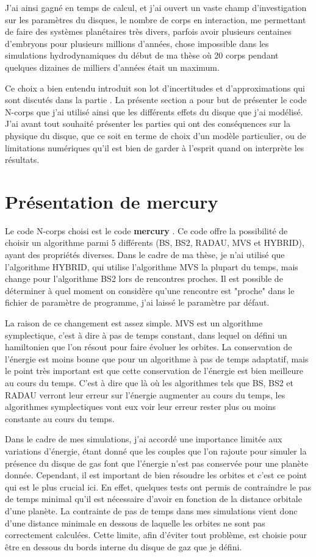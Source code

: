 \documentclass[logos,parttoc]{bordeaux-thesis}
\begin{document}
J'ai ainsi gagné en temps de calcul, et j'ai ouvert un vaste champ d'investigation sur les paramètres du disques, le nombre de corps en interaction, me permettant de faire des systèmes planétaires très divers, parfois avoir plusieurs centaines d'embryons pour plusieurs millions d'années, chose impossible dans les simulations hydrodynamiques du début de ma thèse où 20 corps pendant quelques dizaines de milliers d'années était un maximum. 

Ce choix a bien entendu introduit son lot d'incertitudes et d'approximations qui sont discutés dans la partie . La présente section a pour but de présenter le code N-corps que j'ai utilisé ainsi que les différents effets du disque que j'ai modélisé. J'ai avant tout souhaité présenter les parties qui ont des conséquences sur la physique du disque, que ce soit en terme de choix d'un modèle particulier, ou de limitations numériques qu'il est bien de garder à l'esprit quand on interprète les résultats.

\section{Présentation de mercury}
Le code N-corps choisi est le code \textbf{mercury} \citep{chambers1999hybrid}. Ce code offre la possibilité de choisir un algorithme parmi 5 différents (BS, BS2, RADAU, MVS et HYBRID), ayant des propriétés diverses. Dans le cadre de ma thèse, je n'ai utilisé que l'algorithme HYBRID, qui utilise l'algorithme MVS la plupart du temps, mais change pour l'algorithme BS2 lors de rencontres proches. Il est possible de déterminer à quel moment on considère qu'une rencontre est "proche" dans le fichier de paramètre de programme, j'ai laissé le paramètre par défaut. 

La raison de ce changement est assez simple. MVS est un algorithme symplectique, c'est à dire à pas de temps constant, dans lequel on défini un hamiltonien que l'on résout pour faire évoluer les orbites. La conservation de l'énergie est moins bonne que pour un algorithme à pas de temps adaptatif, mais le point très important est que cette conservation de l'énergie est bien meilleure au cours du temps. C'est à dire que là où les algorithmes tels que BS, BS2 et RADAU verront leur erreur sur l'énergie augmenter au cours du temps, les algorithmes symplectiques vont eux voir leur erreur rester plus ou moins constante au cours du temps. 

Dans le cadre de mes simulations, j'ai accordé une importance limitée aux variations d'énergie, étant donné que les couples que l'on rajoute pour simuler la présence du disque de gas font que l'énergie n'est pas conservée pour une planète donnée. Cependant, il est important de bien résoudre les orbites et c'est ce point qui est le plus crucial ici. En effet, quelques tests ont permis de contraindre le pas de temps minimal qu'il est nécessaire d'avoir en fonction de la distance orbitale d'une planète. La contrainte de pas de temps dans mes simulations vient donc d'une distance minimale en dessous de laquelle les orbites ne sont pas correctement calculées. Cette limite, afin d'éviter tout problème, est choisie pour être en dessous du bords interne du disque de gaz que je défini.
\end{document}

